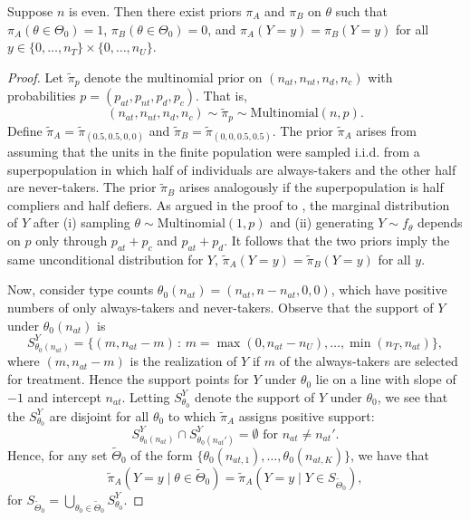 \documentclass[12pt,reqno]{amsart}
\begin{document}
\begin{lem} \label{lem: there exist equiv priors on the null and alt}
Suppose $n$ is even. Then there exist priors $\pi_A$ and $\pi_B$ on $\theta$
such
that $\pi_A(\theta \in \Theta_0) = 1$, $\pi_B(\theta \in \Theta_0) = 0$, and $\pi_A(Y{=}y)
= \pi_B(Y{=}y)$ for all $y \in \{0,\ldots,n_T\} \times \{0,\ldots, n_U\}$.     
\end{lem}
\begin{proof}
Let $\tilde{\pi}_p$ denote the multinomial prior on $(n_{at},n_{nt},n_{d},n_{c})$ with
probabilities $p = (p_{at},p_{nt},p_{d},p_{c})$. That is, \[
(n_{at},n_{nt},n_{d},n_{c}) \sim \tilde\pi_p \sim \mathrm{Multinomial}(n, p).
\] 
Define $\tilde{\pi}_A = \tilde{\pi}_{(0.5,0.5,0,0)}$ and $\tilde{\pi}_B =
 \tilde{\pi}_{(0,0,0.5,0.5)}$. The prior $\tilde{\pi}_A$ arises from assuming that the
 units in the finite population were sampled i.i.d. from a superpopulation in which half
 of individuals are always-takers and the other half are never-takers. The prior
 $\tilde{\pi}_B$ arises analogously if the superpopulation is half compliers and half
 defiers. As argued in the proof to , the marginal distribution of $Y$ after (i) sampling $\theta \sim \mathrm{Multinomial}(1, p)$ and (ii) generating $Y \sim f_{\theta}$ depends on $p$ only through $p_{at}+p_c$ and $p_{at} + p_d$. It follows that the two priors imply the same unconditional distribution for $Y$, $\tilde\pi_A(Y{=}y) = \tilde\pi_B(Y{=}y)$ for all $y$. 


Now, consider type counts $\theta_0(n_{at}) = (n_{at}, n-n_{at}, 0,0)$, which have positive numbers of only always-takers and never-takers. Observe that the support
of $Y$ under $\theta_0(n_{at})$ is
\begin{equation}
  S^Y_{\theta_0(n_{at})} = \{ (m,n_{at}-m) \,:\, m = \max(0, n_{at}-n_U) ,\ldots,\min(n_T,n_{at}) \}, \label{eqn:s0}  
\end{equation} where $(m,n_{at}-m)$ is the realization of $Y$ if
$m$ of the always-takers are selected for treatment. Hence the support points for $Y$ under
$\theta_0$ lie on a line with slope of $-1$ and intercept $n_{at}$. Letting $S^Y_{\theta_0}$
denote the support of $Y$ under $\theta_0$, we see that the $S^Y_{\theta_0}$ are disjoint
for all $\theta_0$ to which $\tilde{\pi}_A$ assigns positive support: \[
S^Y_{\theta_0(n_{at})} \cap S^Y_{\theta_0(n_{at}')} = \emptyset \text{ for $n_{at} \neq
n_{at}'$}
.\] Hence, for any
set
$\tilde{\Theta}_0$ of the form $\{ \theta_0(n_{at,1}), \ldots, \theta_0(n_{at,K}) \}$, we have that $$\tilde{\pi}_{A}(Y=y \mid \theta \in
\tilde{\Theta}_0) = \tilde{\pi}_A( Y=y \mid Y \in S_{\tilde{\Theta}_0}),$$ for
$S_{\tilde{\Theta}_0} = \bigcup_{\theta_0 \in \tilde\Theta_0} S^{Y}_{\theta_0}$.


\end{proof}
\end{document}
